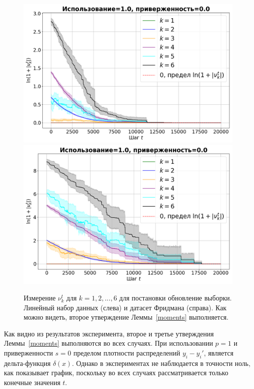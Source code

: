     \begin{figure}[h!]
        \centering
        \includegraphics[width=0.49\linewidth]{pictures/k_mom_su_synthetic_sgd_model_50_1.0_0.0.png}
        \includegraphics[width=0.49\linewidth]{pictures/k_mom_su_friedman_sgd_model_50_1.0_0.0.png}
        
        \caption{Измерение $\nu_k^t$ для $k = 1, 2, ... , 6$ для постановки обновление выборки. Линейный набор данных (слева) и датасет Фридмана (справа). Как можно видеть, второе утверждение Леммы~\ref{moments} выполняется.}
        \label{fig_exp_5_2}
    \end{figure}

    Как видно из результатов эксперимента, второе и третье утверждения Леммы~\ref{moments} выполняются во всех случаях. При использовании $p = 1$ и приверженности $s = 0$ пределом плотности распределений $y_i - y_i'$, является дельта-функция $\delta(x)$. Однако в экспериментах не наблюдается в точности ноль, как показывает график, поскольку во всех случаях рассматривается только конечные значения $t$.


    

    






    



